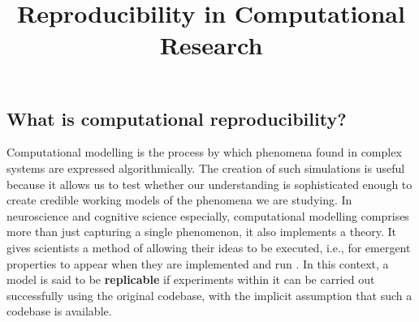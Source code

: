 \documentclass[jou]{apa6}
\title{Reproducibility in Computational Research}
\begin{document}
\maketitle



%

\subsection*{What is computational reproducibility?}
Computational modelling is the process by which phenomena found in complex systems are expressed algorithmically.
The creation of such simulations is useful because it allows us to test whether our understanding is sophisticated enough to create credible working models of the phenomena we are studying.
In neuroscience and cognitive science especially, computational modelling comprises more than just capturing a single phenomenon, it also  implements a theory.
It gives scientists a method of allowing their ideas to be executed, i.e., for emergent properties to appear when they are implemented and run \cite{mcclelland09}.
In this context, a model is said to be  \textbf{replicable} if experiments within it can be carried out successfully using the original codebase, with the implicit assumption that such a codebase is available.
\end{document}
